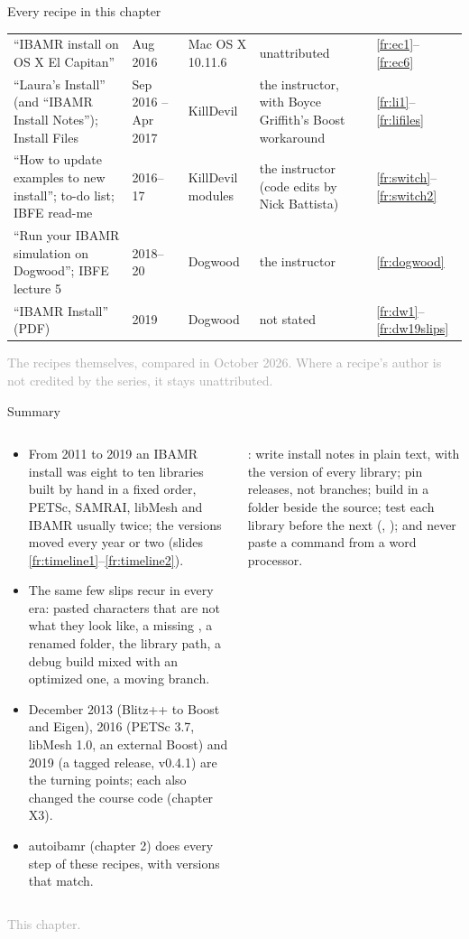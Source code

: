 \documentclass[aspectratio=169,11pt]{beamer}
\newcommand{\sourcecredit}[1]{\vfill\begin{flushright}\tiny\textcolor{DarkGray}{#1}\end{flushright}}
\begin{document}
\begin{frame}{Every recipe in this chapter}
\begin{tabular}{@{}L{0.3\textwidth}L{0.12\textwidth}L{0.2\textwidth}L{0.2\textwidth}L{0.1\textwidth}@{}}
``IBAMR install on OS X El Capitan'' & Aug 2016 & Mac OS X 10.11.6 & unattributed & \ref{fr:ec1}--\ref{fr:ec6} \\
``Laura's Install'' (and ``IBAMR Install Notes''); Install Files & Sep 2016 -- Apr 2017 & KillDevil & the instructor, with Boyce Griffith's Boost workaround & \ref{fr:li1}--\ref{fr:lifiles} \\
``How to update examples to new install''; to-do list; IBFE read-me & 2016--17 & KillDevil modules & the instructor (code edits by Nick Battista) & \ref{fr:switch}--\ref{fr:switch2} \\
``Run your IBAMR simulation on Dogwood''; IBFE lecture 5 & 2018--20 & Dogwood & the instructor & \ref{fr:dogwood} \\
``IBAMR Install'' (PDF) & 2019 & Dogwood & not stated & \ref{fr:dw1}--\ref{fr:dw19slips} \\
\bottomrule
\end{tabular}
\sourcecredit{The recipes themselves, compared in October 2026. Where a recipe's author is not credited by the series, it stays unattributed.}
\end{frame}

\begin{frame}{Summary}
\label{fr:summary}
\begin{columns}[T,onlytextwidth]
\begin{column}{0.55\textwidth}
\footnotesize
\begin{itemize}\setlength{\itemsep}{3pt}
  \item From 2011 to 2019 an IBAMR install was eight to ten libraries built by hand in a fixed order, PETSc, SAMRAI, libMesh and IBAMR usually twice; the versions moved every year or two (slides \ref{fr:timeline1}--\ref{fr:timeline2}).
  \item The same few slips recur in every era: pasted characters that are not what they look like, a missing , a renamed folder, the library path, a debug build mixed with an optimized one, a moving branch.
  \item December 2013 (Blitz++ to Boost and Eigen), 2016 (PETSc 3.7, libMesh 1.0, an external Boost) and 2019 (a tagged release, v0.4.1) are the turning points; each also changed the course code (chapter X3).
  \item autoibamr (chapter 2) does every step of these recipes, with versions that match.
\end{itemize}
\end{column}
\begin{column}{0.42\textwidth}
\begin{punchbox}
\small {}: write install notes in plain text, with the version of every library; pin releases, not branches; build in a folder beside the source; test each library before the next (, ); and never paste a command from a word processor.
\end{punchbox}
\end{column}
\end{columns}
\sourcecredit{This chapter.}
\end{frame}
\end{document}
